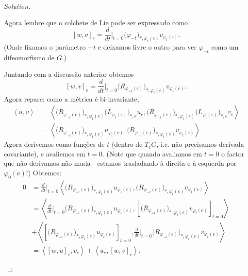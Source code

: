 \begin{proof}[Solution]
\begin{enumerate}[label=(\alph*)]
Agora lembre que o colchete de Lie pode ser expressado como
\[[w,v]_e=\frac{d}{dt}\Big|_{t=0}\Big(\varphi_{-t}\Big)_{*,\varphi_t(e)}v_{\varphi_t(e)}.\]
(Onde fixamos o parámetro \(-t\) e deixamos livre o outro para ver \(\varphi_{-t}\) como um difeomorfismo de \(G\).)

Juntando com a discussão anterior obtemos
\[[w,v]_e=\frac{d}{dt}\Big|_{t=0}\Big(R_{\varphi_{-t}(e)}\Big)_{*,\varphi_t(e)}v_{\varphi_t(e)}.\]
Agora repare: como a métrica é bi-invariante,
\begin{align*}
\left<u,v\right>&=\left<\Big(R_{\varphi_{-t}(e)}\Big)_{*,\varphi_t(e)}\Big(L_{\varphi_{t}(e)}\Big)_{*,e}u_{e},\Big(R_{\varphi_{-t}(e)}\Big)_{*,\varphi_t(e)}\Big(L_{\varphi_{t}(e)}\Big)_{*,e}v_{e}\right>\\
&=\left<\Big(R_{\varphi_{-t}(e)}\Big)_{*,\varphi_t(e)}u_{\varphi_t(e)},\Big(R_{\varphi_{-t}(e)}\Big)_{*,\varphi_t(e)}v_{\varphi_t(e)}\right>
\end{align*}
Agora derivemos como funções de \(t\) (dentro de \(T_eG\), i.e. não precisamos derivada covariante), e avaliemos em  \(t=0\). (Note que quando avaliamos em  \(t=0\) o factor que não derivamos não muda---estamos trasladando à direita e à esquerda por \(\varphi_0(e)\)!) Obtemos:
\begin{align*}
0&=\frac{d}{dt}\Big|_{t=0}\left<\Big(R_{\varphi_{-t}(e)}\Big)_{*,\varphi_t(e)}u_{\varphi_t(e)},\Big(R_{\varphi_{-t}(e)}\Big)_{*,\varphi_t(e)}v_{\varphi_t(e)}\right>\\
 &=\left<\frac{d}{dt}\Big|_{t=0}\Big(R_{\varphi_{-t}(e)}\Big)_{*,\varphi_t(e)}u_{\varphi_t(e)},\left[\Big(R_{\varphi_{-t}(e)}\Big)_{*,\varphi_t(e)}v_{\varphi_t(e)}\right]_{t=0}\right>\\
&+\left<\left[\Big(R_{\varphi_{-t}(e)}\Big)_{*,\varphi_t(e)}u_{\varphi_t(e)}\right]_{t=0},\frac{d}{dt}\Big|_{t=0}\Big(R_{\varphi_{-t}(e)}\Big)_{*,\varphi_t(e)}v_{\varphi_t(e)}\right>\\
&=\left<[w,u]_e,v_e\right>+\left<u_e,[w,v]_e\right>.
\end{align*}
\end{enumerate}


\end{proof}

